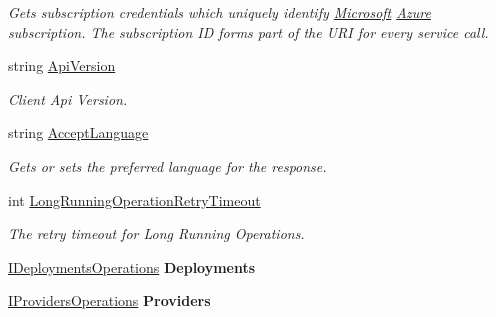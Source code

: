 \begin{DoxyCompactItemize}
\begin{DoxyCompactList}\small\item\em Gets subscription credentials which uniquely identify \hyperlink{namespace_microsoft}{Microsoft} \hyperlink{namespace_microsoft_1_1_azure}{Azure} subscription. The subscription ID forms part of the U\+RI for every service call. \end{DoxyCompactList}\item 
string \hyperlink{interface_microsoft_1_1_azure_1_1_management_1_1_resources_1_1_i_resource_management_client_af0fe92fb0e05a0db48a8f81f9d9d0eda}{Api\+Version}
\begin{DoxyCompactList}\small\item\em Client Api Version. \end{DoxyCompactList}\item 
string \hyperlink{interface_microsoft_1_1_azure_1_1_management_1_1_resources_1_1_i_resource_management_client_ad77527c37922f39b139a21d4c973d1fd}{Accept\+Language}
\begin{DoxyCompactList}\small\item\em Gets or sets the preferred language for the response. \end{DoxyCompactList}\item 
int \hyperlink{interface_microsoft_1_1_azure_1_1_management_1_1_resources_1_1_i_resource_management_client_ad843dd318d88f4e31058ce9f0c7891a5}{Long\+Running\+Operation\+Retry\+Timeout}
\begin{DoxyCompactList}\small\item\em The retry timeout for Long Running Operations. \end{DoxyCompactList}\item 
\hyperlink{interface_microsoft_1_1_azure_1_1_management_1_1_resources_1_1_i_deployments_operations}{I\+Deployments\+Operations} {\bfseries Deployments}\hypertarget{interface_microsoft_1_1_azure_1_1_management_1_1_resources_1_1_i_resource_management_client_acf082411a76c642863ecae7ff22b4df5}{}\label{interface_microsoft_1_1_azure_1_1_management_1_1_resources_1_1_i_resource_management_client_acf082411a76c642863ecae7ff22b4df5}

\item 
\hyperlink{interface_microsoft_1_1_azure_1_1_management_1_1_resources_1_1_i_providers_operations}{I\+Providers\+Operations} {\bfseries Providers}\hypertarget{interface_microsoft_1_1_azure_1_1_management_1_1_resources_1_1_i_resource_management_client_a6f04df75b1e982a749e101afa4758b8a}{}\label{interface_microsoft_1_1_azure_1_1_management_1_1_resources_1_1_i_resource_management_client_a6f04df75b1e982a749e101afa4758b8a}


\end{DoxyCompactItemize}
